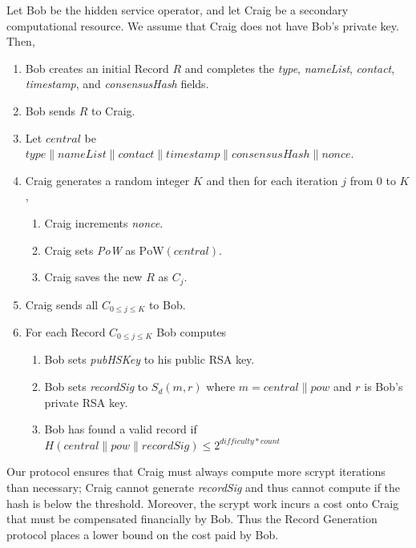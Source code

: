 \documentclass{sig-alternate}
\newcommand*\concat{\mathbin{\|}}
\begin{document}
Let Bob be the hidden service operator, and let Craig be a secondary computational resource. We assume that Craig does not have Bob's private key. Then,

\begin{enumerate}
	\item Bob creates an initial Record $ R $ and completes the \emph{type}, \emph{nameList}, \emph{contact}, \emph{timestamp}, and \emph{consensusHash} fields.
	\item Bob sends $ R $ to Craig.
	\item Let $ \mathit{central} $ be $\mathit{type} \concat \mathit{nameList} \concat \mathit{contact} \concat \mathit{timestamp} \concat \mathit{consensusHash} \concat \mathit{nonce} $.
	\item Craig generates a random integer $ K $ and then for each iteration $ j $ from 0 to $ K $,
		\begin{enumerate}
			\item Craig increments \emph{nonce}.
			\item Craig sets \emph{PoW} as $ \mathrm{PoW}(\mathit{central}) $.
			\item Craig saves the new $ R $ as $ C_{j} $.
		\end{enumerate}
	\item Craig sends all $ C_{0 \le j \le K} $ to Bob.
	\item For each Record $ C_{0 \le j \le K} $ Bob computes
		\begin{enumerate}
			\item Bob sets \emph{pubHSKey} to his public RSA key.
			\item Bob sets \emph{recordSig} to $ S_{d}(m, r) $ where $ m = \mathit{central} \concat \mathit{pow} $ and $ r $ is Bob's private RSA key.
			\item Bob has found a valid record if $ H(\mathit{central} \concat \mathit{pow} \concat \mathit{recordSig}) \leq 2^{\mathit{difficulty} * \mathit{count}} $
		\end{enumerate}
\end{enumerate}


Our protocol ensures that Craig must always compute more scrypt iterations than necessary; Craig cannot generate \emph{recordSig} and thus cannot compute if the hash is below the threshold. Moreover, the scrypt work incurs a cost onto Craig that must be compensated financially by Bob. Thus the Record Generation protocol places a lower bound on the cost paid by Bob.
\end{document}
